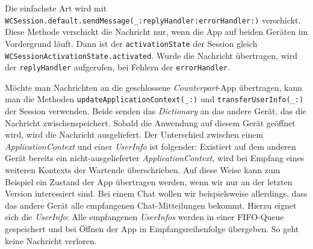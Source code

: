 Die einfachste Art wird mit \texttt{WC\-Session.default.send\-Message(\_:reply\-Handler:error\-Handler:)} verschickt. Diese Methode verschickt die Nachricht nur, wenn die App auf beiden Geräten im Vordergrund läuft. Dann ist der \texttt{activation\-State} der Session gleich \texttt{WC\-Session\-Activation\-State.activated}. Wurde die Nachricht übertragen, wird der \texttt{reply\-Handler} aufgerufen, bei Fehlern der \texttt{error\-Handler}.

Möchte man Nachrichten an die geschlossene \emph{Counterpart}-App übertragen, kann man die Methoden \texttt{updateApplicationContext(\_:)} und \texttt{transfer\-User\-Info(\_:)} der Session verwenden. Beide senden das \emph{Dictionary} an das andere Gerät, das die Nachricht zwischenspeichert. Sobald die Anwendung auf diesem Gerät geöffnet wird, wird die Nachricht ausgeliefert. Der Unterschied zwischen einem \emph{Application\-Context} und einer \emph{User\-Info} ist folgender: Existiert auf dem anderen Gerät bereits ein nicht-ausgelieferter \emph{Application\-Context}, wird bei Empfang eines weiteren Kontexts der Wartende überschrieben. Auf diese Weise kann zum Beispiel ein Zustand der App übertragen werden, wenn wir nur an der letzten Version interessiert sind. Bei einem Chat wollen wir beispielsweise allerdings, dass das andere Gerät alle empfangenen Chat-Mitteilungen bekommt. Hierzu eignet sich die \emph{User\-Info}: Alle empfangenen \emph{User\-Infos} werden in einer FIFO-Queue gespeichert und bei Öffnen der App in Empfangsreihenfolge übergeben. So geht keine Nachricht verloren.

